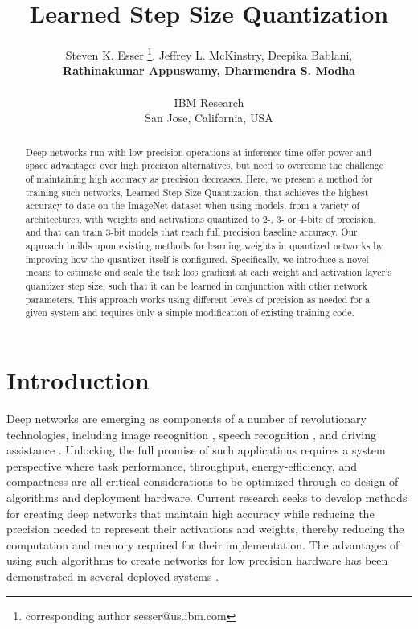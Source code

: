 \documentclass{article}
\title{Learned Step Size Quantization}
\author{Steven K. Esser \thanks{corresponding author sesser@us.ibm.com},
Jeffrey L. McKinstry,
Deepika Bablani, \\
\textbf{Rathinakumar Appuswamy,
Dharmendra S. Modha}\\
\\
IBM Research \\
San Jose, California, USA \\
}
\begin{document}
\maketitle



\begin{abstract}
Deep networks run with low precision operations at inference time offer power and space advantages over high precision alternatives, but need to overcome the challenge of maintaining high accuracy as precision decreases.
Here, we present a method for training such networks, Learned Step Size Quantization, that achieves the highest accuracy to date on the ImageNet dataset when using models, from a variety of architectures, with weights and activations quantized to 2-, 3- or 4-bits of precision, and that can train 3-bit models that reach full precision baseline accuracy.
Our approach builds upon existing methods for learning weights in quantized networks by improving how the quantizer itself is configured.
Specifically, we introduce a novel means to estimate and scale the task loss gradient at each weight and activation layer's quantizer step size, such that it can be learned in conjunction with other network parameters.
This approach works using different levels of precision as needed for a given system and requires only a simple modification of existing training code.



\end{abstract}


\section{Introduction}

Deep networks are emerging as components of a number of revolutionary technologies, including image recognition \citep{krizhevsky2012imagenet}, speech recognition \citep{hinton2012deep}, and driving assistance \citep{xu2017end}.
Unlocking the full promise of such applications requires a system perspective where task performance, throughput, energy-efficiency, and compactness are all critical considerations to be optimized through co-design of algorithms and deployment hardware.
Current research seeks to develop methods for creating deep networks that maintain high accuracy while reducing the precision needed to represent their activations and weights, thereby reducing the computation and memory required for their implementation.
The advantages of using such algorithms to create networks for low precision hardware has been demonstrated in several deployed systems \citep{Esser11441, jouppi2017datacenter, qiu2016going}.
\end{document}

